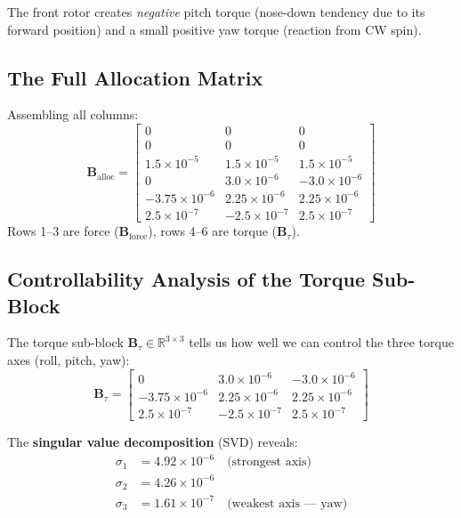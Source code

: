\documentclass[12pt, a4paper]{article}
\newcommand{\R}{\mathbb{R}}
\newcommand{\bB}{\bm{B}}
\begin{document}
The front rotor creates \emph{negative} pitch torque (nose-down tendency due to its forward position) and a small positive yaw torque (reaction from CW spin).

\subsection{The Full Allocation Matrix}

Assembling all columns:
\begin{equation}
    \bB_{\text{alloc}} = \begin{bmatrix}
        0 & 0 & 0 \\
        0 & 0 & 0 \\
        1.5\times10^{-5} & 1.5\times10^{-5} & 1.5\times10^{-5} \\
        0 & 3.0\times10^{-6} & -3.0\times10^{-6} \\
        -3.75\times10^{-6} & 2.25\times10^{-6} & 2.25\times10^{-6} \\
        2.5\times10^{-7} & -2.5\times10^{-7} & 2.5\times10^{-7}
    \end{bmatrix}
\end{equation}
Rows 1--3 are force ($\bB_{\text{force}}$), rows 4--6 are torque ($\bB_\tau$).

\subsection{Controllability Analysis of the Torque Sub-Block}

The torque sub-block $\bB_\tau \in \R^{3 \times 3}$ tells us how well we can control the three torque axes (roll, pitch, yaw):
\begin{equation}
    \bB_\tau = \begin{bmatrix}
        0 & 3.0\times10^{-6} & -3.0\times10^{-6} \\
        -3.75\times10^{-6} & 2.25\times10^{-6} & 2.25\times10^{-6} \\
        2.5\times10^{-7} & -2.5\times10^{-7} & 2.5\times10^{-7}
    \end{bmatrix}
\end{equation}

The \textbf{singular value decomposition} (SVD) reveals:
\begin{align}
    \sigma_1 &= 4.92 \times 10^{-6} \quad \text{(strongest axis)} \\
    \sigma_2 &= 4.26 \times 10^{-6} \\
    \sigma_3 &= 1.61 \times 10^{-7} \quad \text{(weakest axis --- yaw)}
\end{align}
\end{document}

